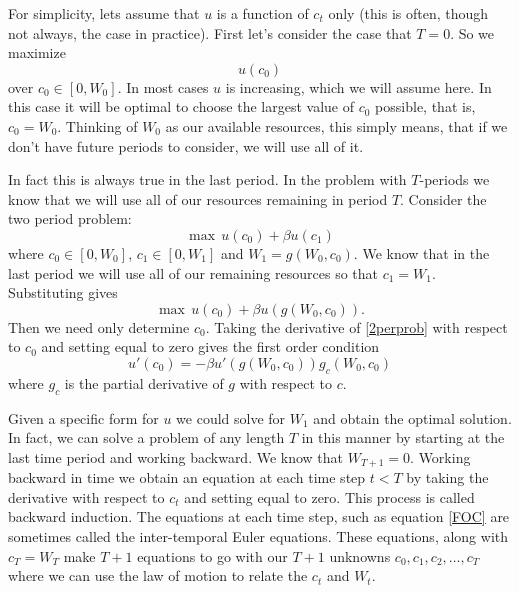 For simplicity, lets assume that $u$ is a function of $c_t$ only (this is often, though not always, the case in practice).  First let's consider the case that $T=0$.  So we maximize
\begin{equation}\label{1perprob}
u(c_0)
\end{equation}
over $c_0 \in [0,W_0]$.  In most cases $u$ is increasing, which we will assume here.  In this case it will be optimal to choose the largest value of $c_0$ possible, that is, $c_0 = W_0$.  Thinking of $W_0$ as our available resources, this simply means, that if we don't have future periods to consider, we will use all of it.

In fact this is always true in the last period.  In the problem with $T$-periods we know that we will use all of our resources remaining in period $T$.  Consider the two period problem:
\begin{equation}
\label{2perprob}
\max \, u(c_0) + \beta u(c_1)
\end{equation}
where $c_0 \in [0,W_0]$, $c_1 \in [0,W_1]$ and $W_1 = g(W_0,c_0)$.  We know that in the last period we will use all of our remaining resources so that $c_1 = W_1$.  Substituting gives
\begin{equation*}
\max \, u(c_0) + \beta u(g(W_0,c_0)).
\end{equation*}
Then we need only determine $c_0$.  Taking the derivative of \eqref{2perprob} with respect to $c_0$ and setting equal to zero gives the first order condition
\begin{equation}
\label{FOC}
u'(c_0) = -\beta u'(g(W_0,c_0))g_c(W_0,c_0)
\end{equation}
where $g_c$ is the partial derivative of $g$ with respect to $c$.

Given a specific form for $u$ we could solve for $W_1$ and obtain the optimal solution.  In fact, we can solve a problem of any length $T$ in this manner by starting at the last time period and working backward.  We know that $W_{T+1} = 0$.  Working backward in time we obtain an equation at each time step $t<T$ by taking the derivative with respect to $c_t$ and setting equal to zero.  This process is called backward induction.  The equations at each time step, such as equation \eqref{FOC} are sometimes called the inter-temporal Euler equations.  These equations, along with $c_T = W_T$ make $T+1$ equations to go with our $T+1$ unknowns $c_0,c_1,c_2,\ldots,c_T$ where we can use the law of motion to relate the $c_t$ and $W_t$.


